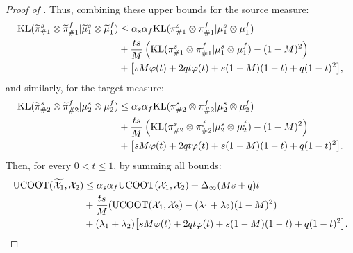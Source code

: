 \begin{proof}[Proof of ]
  Thus, combining these upper bounds for the source measure:
  \begin{equation}
    \begin{split}
      \text{KL}(\widetilde{\pi}^s_{\#1} \otimes \widetilde{\pi}^f_{\#1} \vert \widetilde{\mu}^s_1 \otimes \widetilde{\mu}^f_1)
      &\leq \alpha_s\alpha_f \text{KL}(\pi^s_{\#1} \otimes \pi^f_{\#1} \vert \mu^s_1 \otimes \mu^f_1) \\
      &+ \frac{ts}{M}\left(\text{KL}(\pi^s_{\#1} \otimes \pi^f_{\#1} \vert \mu^s_1 \otimes \mu^f_1) - (1-M)^2\right) \\
      &+ \big[  sM \varphi(t)+ 2q t \varphi(t) + s(1-M)(1-t) + q(1-t)^2 \big],
    \end{split}
  \end{equation}
  and similarly, for the target measure:
  \begin{equation}
    \begin{split}
      \text{KL}(\widetilde{\pi}^s_{\#2} \otimes \widetilde{\pi}^f_{\#2} \vert \mu^s_2 \otimes \mu^f_2)
      &\leq \alpha_s\alpha_f \text{KL}(\pi^s_{\#2} \otimes \pi^f_{\#2} \vert \mu^s_2 \otimes \mu^f_2) \\
      &+ \frac{ts}{M}\left(\text{KL}(\pi^s_{\#2} \otimes \pi^f_{\#2} \vert \mu^s_2 \otimes \mu^f_2)
      - (1-M)^2\right) \\
      &+ \big[ sM \varphi(t)+ 2q t \varphi(t) + s(1-M)(1-t) + q(1-t)^2 \big].
    \end{split}
  \end{equation}
  Then, for every $0 < t \leq 1$, by summing all bounds:
  \begin{equation}
    \begin{split}
      \text{UCOOT}(\widetilde{\mathcal X_1}, \mathcal X_2) &\leq \alpha_s\alpha_f \text{UCOOT}(\mathcal X_1, \mathcal X_2) +
      \Delta_{\infty}(Ms + q)t \\
      &+ \frac{ts}{M}(\text{UCOOT}(\mathcal X_1, \mathcal X_2) - (\lambda_1 + \lambda_2)(1-M)^2) \\
      &+ (\lambda_1 + \lambda_2) \big[ s M \varphi(t) + 2q t \varphi(t)
      + s(1-M)(1-t) + q(1-t)^2 \big].
    \end{split}
  \end{equation}

\end{proof}
